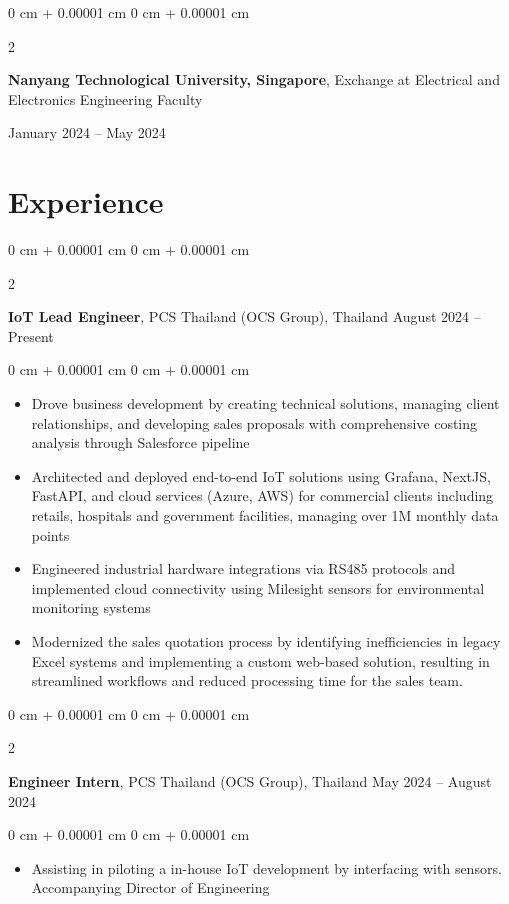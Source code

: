 \documentclass[10pt, letterpaper]{article}
\newenvironment{highlights}{
    \begin{itemize}[
        topsep=0.0 cm,
        parsep=0.0 cm,
        partopsep=0pt,
        itemsep=0pt,
        leftmargin=0 cm + 10pt
    ]
}{
    \end{itemize}
} %
\newenvironment{onecolentry}{
    \begin{adjustwidth}{
        0 cm + 0.00001 cm
    }{
        0 cm + 0.00001 cm
    }
}{
    \end{adjustwidth}
} %
\newenvironment{twocolentry}[2][]{
    \onecolentry
    \def\secondColumn{#2}
    \setcolumnwidth{\fill, 4.5 cm}
    \begin{paracol}{2}
}{
    \switchcolumn \raggedleft \secondColumn
    \end{paracol}
    \endonecolentry
} %
\begin{document}
        \begin{twocolentry}{January 2024 – May 2024}
            \textbf{Nanyang Technological University, Singapore}, Exchange at Electrical and Electronics Engineering Faculty
        \end{twocolentry}
        
    \vspace{0.20 cm}
    \section{Experience}
        \begin{twocolentry}{August 2024 – Present}
        \textbf{IoT Lead Engineer}, PCS Thailand (OCS Group), Thailand\end{twocolentry}
        \vspace{0.1 cm}
        \begin{onecolentry}\begin{highlights}
            \item Drove business development by creating technical solutions, managing client relationships, and developing sales proposals with comprehensive costing analysis through Salesforce pipeline
            \item Architected and deployed end-to-end IoT solutions using Grafana, NextJS, FastAPI, and cloud services (Azure, AWS) for commercial clients including retails, hospitals and government facilities, managing over 1M monthly data points
            \item Engineered industrial hardware integrations via RS485 protocols and implemented cloud connectivity using Milesight sensors for environmental monitoring systems
            \item Modernized the sales quotation process by identifying inefficiencies in legacy Excel systems and implementing a custom web-based solution, resulting in streamlined workflows and reduced processing time for the sales team.
        \end{highlights}\end{onecolentry}
        
        \vspace{0.2 cm}
        \begin{twocolentry}{May 2024 – August 2024}
        \textbf{Engineer Intern}, PCS Thailand (OCS Group), Thailand\end{twocolentry}
        \vspace{0.10 cm}
        \begin{onecolentry}\begin{highlights}
            \item Assisting in piloting a in-house IoT development by interfacing with sensors. Accompanying Director of Engineering 
        \end{highlights}\end{onecolentry}
\end{document}

